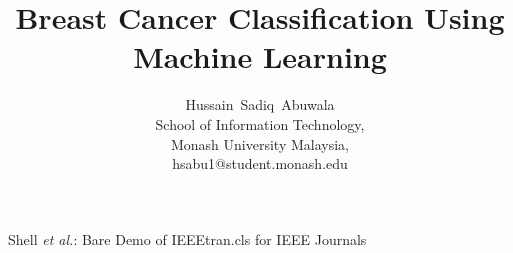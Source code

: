 \documentclass[journal]{IEEEtran}
\begin{document}
%
\title{Breast Cancer Classification Using\\ Machine Learning}
%
%
%

\author{Hussain~Sadiq~Abuwala\\School of Information Technology,\\ Monash University Malaysia,\\hsabu1@student.monash.edu}
        


% 
%



%
{Shell \MakeLowercase{\textit{et al.}}: Bare Demo of IEEEtran.cls for IEEE Journals}
% 
\end{document}
